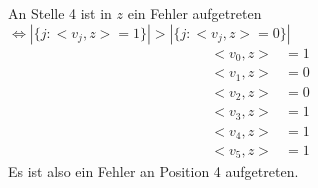 \begin{myList}
An Stelle 4 ist in $z$ ein Fehler aufgetreten $\Leftrightarrow |\lbrace j: <v_j,z> = 1\rbrace| > |\lbrace j:<v_j,z> = 0 \rbrace|$
\begin{align*}
	<v_0,z> &= 1 \\
	<v_1,z> &= 0 \\
	<v_2,z> &= 0 \\
	<v_3,z> &= 1 \\
	<v_4,z> &= 1 \\
	<v_5,z> &= 1 
\end{align*}
Es ist also ein Fehler an Position 4 aufgetreten.
\end{myList}


